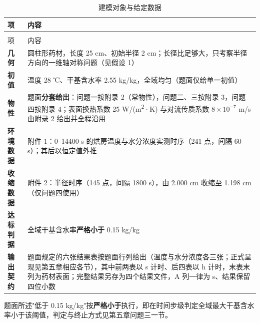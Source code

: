 \begin{longtable}{>{\centering\arraybackslash}m{\dimexpr 0.196\tblw\relax}>{\raggedright\arraybackslash}m{\dimexpr 0.804\tblw\relax}}
  \caption{建模对象与给定数据}\label{tab:1-1}\\
  \toprule
    项 & 内容 \\
  \midrule
  \endfirsthead
  \multicolumn{2}{r}{\footnotesize（续）}\\
  \toprule
    项 & 内容 \\
  \midrule
  \endhead
  \bottomrule
  \endfoot
  \bottomrule
  \endlastfoot
  \textbf{几何} & 圆柱形药材，长度 25 cm、初始半径 2 cm；长径比足够大，只考察半径方向的一维轴对称问题（见假设 1） \\
  \textbf{初值} & 温度 28 ℃、干基含水率 2.55 kg/kg，全域均匀（题面仅给单一初值） \\
  \textbf{物性} & 题面\textbf{分套给出}：问题一按附录 2（常物性），问题二、三按附录 3，问题四按附录 4；表面换热系数 25 W/(m\textsuperscript{2}·K) 与对流传质系数 $8\times10^{-7}$ m/s 由附录 2 给出并全程沿用 \\
  \textbf{环境数据} & 附件 1：0–14400 s 的烘房温度与水分浓度实测时序（241 点，间隔 60 s）；其后以恒定值外推 \\
  \textbf{收缩数据} & 附件 2：半径时序（145 点，间隔 1800 s），由 2.000 cm 收缩至 1.198 cm（仅问题四使用） \\
  \textbf{达标判据} & 全域干基含水率\textbf{严格小于} 0.15 kg/kg \\
  \textbf{输出契约} & 题面规定的六张结果表按题面行列给出（温度与水分浓度各三张；正式呈现见第五章相应各节），其中前两表以 s 计时、后四表以 h 计时，末表末列为药材表面；完整结果另存为四个结果文件，A 列一律为 s、结果保留四位小数 \\
\end{longtable}

题面所述"低于 0.15 kg/kg"按\textbf{严格小于}执行，即在时间步级判定全域最大干基含水率小于该阈值，判定与终止方式见第五章问题三一节。
